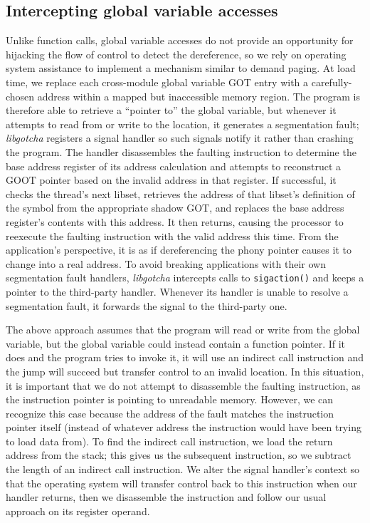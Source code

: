 \subsection{Intercepting global variable accesses}
\label{sec:libgotcha:globals}

Unlike function calls, global variable accesses do not provide an opportunity for
hijacking the flow of control to detect the dereference, so we rely on operating
system assistance to implement a mechanism similar to demand paging.  At load time,
we replace each cross-module global variable GOT entry with a carefully-chosen
address within a mapped but inaccessible memory region.  The program is therefore
able to retrieve a ``pointer to'' the global variable, but whenever it attempts to
read from or write to the location, it generates a segmentation fault;
\textit{libgotcha} registers a signal handler so such signals notify it rather than
crashing the program.  The handler disassembles the faulting instruction to determine
the base address register of its address calculation and attempts to reconstruct a
GOOT pointer based on the invalid address in that register.  If successful, it checks
the thread's next libset, retrieves the address of that libset's definition of the
symbol from the appropriate shadow GOT, and replaces the base address register's
contents with this address.  It then returns, causing the processor to reexecute the
faulting instruction with the valid address this time.  From the application's
perspective, it is as if dereferencing the phony pointer causes it to change into a
real address.  To avoid breaking applications with their own segmentation fault
handlers, \textit{libgotcha} intercepts calls to \texttt{sigaction()} and keeps a
pointer to the third-party handler.  Whenever its handler is unable to resolve a
segmentation fault, it forwards the signal to the third-party one.

The above approach assumes that the program will read or write from the global
variable, but the global variable could instead contain a function pointer.  If it
does and the program tries to invoke it, it will use an indirect call instruction and
the jump will succeed but transfer control to an invalid location.  In this
situation, it is important that we do not attempt to disassemble the faulting
instruction, as the instruction pointer is pointing to unreadable memory.  However,
we can recognize this case because the address of the fault matches the instruction
pointer itself (instead of whatever address the instruction would have been trying to
load data from).  To find the indirect call instruction, we load the return address
from the stack; this gives us the subsequent instruction, so we subtract the length
of an indirect call instruction.  We alter the signal handler's context so that the
operating system will transfer control back to this instruction when our handler
returns, then we disassemble the instruction and follow our usual approach on its
register operand.

